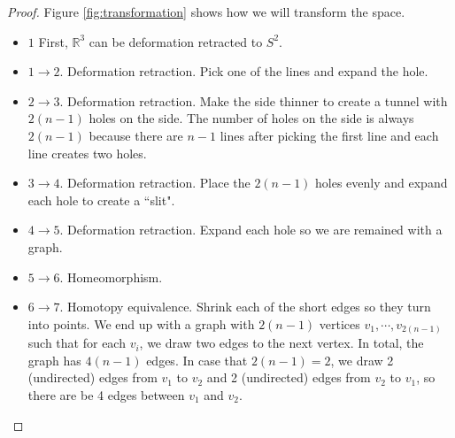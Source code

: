 \documentclass[12pt, psamsfonts]{amsart}
\theoremstyle{definition}
\theoremstyle{remark}
\numberwithin{equation}{section}
\begin{document}
\begin{proof}
  Figure \ref{fig:transformation} shows how we will transform the space.
  \begin{itemize}
    \item
      $1$
      First, $\mathbb{R}^3$ can be deformation retracted to $S^2$.
    \item
      $1 \rightarrow 2$.
      Deformation retraction.
      Pick one of the lines and expand the hole.
    \item
      $2 \rightarrow 3$.
      Deformation retraction.
      Make the side thinner to create a tunnel with $2(n - 1)$ holes on the side.
      The number of holes on the side is always $2(n - 1)$ because there are $n - 1$ lines after picking the first line and each line creates two holes.
    \item
      $3 \rightarrow 4$.
      Deformation retraction.
      Place the $2(n - 1)$ holes evenly and expand each hole to create a ``slit".
    \item
      $4 \rightarrow 5$.
      Deformation retraction.
      Expand each hole so we are remained with a graph.
    \item
      $5 \rightarrow 6$.
      Homeomorphism.
    \item
      $6 \rightarrow 7$.
      Homotopy equivalence.
      Shrink each of the short edges so they turn into points.
      We end up with a graph with $2(n - 1)$ vertices $v_1, \cdots, v_{2(n - 1)}$ such that for each $v_i$, we draw two edges to the next vertex.
      In total, the graph has $4(n - 1)$ edges.
      In case that $2(n - 1) = 2$, we draw 2 (undirected) edges from $v_1$ to $v_2$ and 2 (undirected) edges from $v_2$ to $v_1$, so there are be 4 edges between $v_1$ and $v_2$.
  \end{itemize}


\end{proof}
\end{document}
